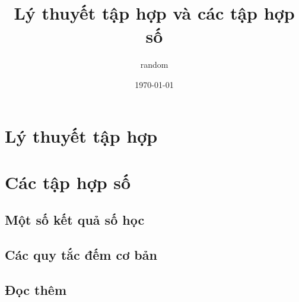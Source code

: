 \documentclass[oneside]{book}
\title{Lý thuyết tập hợp và các tập hợp số}
\author{random}
\date{\today}
\theoremstyle{definition}
\begin{document}
\maketitle




\tableofcontents

\part{Lý thuyết tập hợp}\label{part1}





\part{Các tập hợp số}\label{part2}






\appendix

\chapter{Một số kết quả số học}

\chapter{Các quy tắc đếm cơ bản}

\chapter{Đọc thêm}

\printindex
\end{document}
